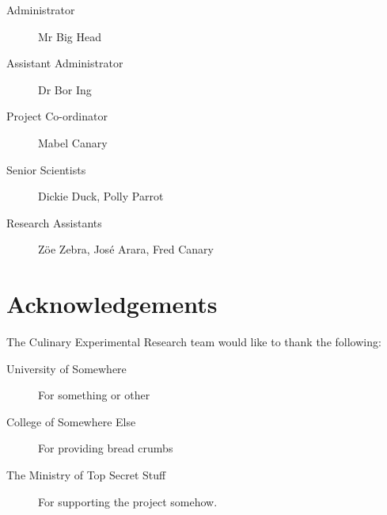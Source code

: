 \documentclass[a4paper,12pt,notumble]{leaflet}
\begin{document}
\begin{description}
\item[Administrator] Mr Big Head

\item[Assistant Administrator] Dr Bor Ing

\item[Project Co-ordinator] Mabel Canary

\item[Senior Scientists] Dickie Duck, Polly Parrot

\item[Research Assistants] Zöe Zebra, José Arara, Fred Canary

\end{description}

\section{Acknowledgements}

The Culinary Experimental Research team would like to thank the
following:

\begin{description}

\item[University of Somewhere] For something or other

\item[College of Somewhere Else] For providing bread crumbs

\item[The Ministry of Top Secret Stuff] For supporting the 
project somehow.

\end{description}
\end{document}
